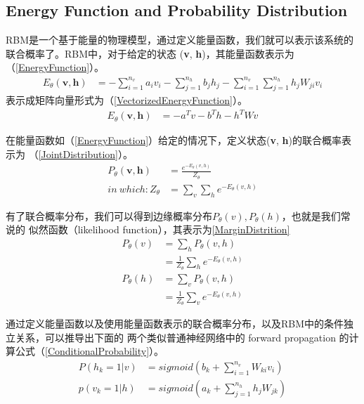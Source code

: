\documentclass[UTF8]{ctexart}
\begin{document}
\subsection{Energy Function and Probability Distribution}
RBM是一个基于能量的物理模型，通过定义能量函数，我们就可以表示该系统的联合概率了。RBM中，对于给定的状态
(\textbf{v}, \textbf{h})，其能量函数表示为（\ref{EnergyFunction}）。
\begin{align}
\label{EnergyFunction}
E_{\theta}(\textbf{v}, \textbf{h}) &= 
 -\sum_{i=1}^{n_v}a_i v_i - \sum_{j=1}^{n_h}b_j h_j 
 - \sum_{i=1}^{n_v} \sum_{j=1}^{n_h} h_j W_{ji} v_i
\end{align}
表示成矩阵向量形式为（\ref{VectorizedEnergyFunction}）。
\begin{align}
\label{VectorizedEnergyFunction}
E_{\theta}(\textbf{v}, \textbf{h}) &= 
 -a^T v - b^T h - h^T W v
\end{align}
\par
在能量函数如（\ref{EnergyFunction}）给定的情况下，定义状态(\textbf{v}, \textbf{h})的联合概率表示为
（\ref{JointDistribution}）。
\begin{align}
\label{JointDistribution}
P_{\theta}(\textbf{v}, \textbf{h}) &= 
  \frac{e^{-E_{\theta}(v, h)}}{Z_{\theta}}
\\
in \ which : Z_{\theta} &= \sum_{v}\sum_{h} e^{-E_{\theta}(v, h)}
\end{align}
\par
有了联合概率分布，我们可以得到边缘概率分布$P_{\theta}(v), P_{\theta}(h)$，也就是我们常说的
似然函数（likelihood function），其表示为\ref{MarginDistrition}
\begin{align}
\label{MarginDistrition}
P_{\theta}(v) &= \sum_{h}P_{\theta}(v, h) \\
&= \frac{1}{Z_{\theta}} \sum_{h}e^{-E_{\theta}(v, h)}
\\
P_{\theta}(h) &= \sum_{v}P_{\theta}(v, h) \\
&= \frac{1}{Z_{\theta}} \sum_{v}e^{-E_{\theta}(v, h)}
\end{align}

\par 通过定义能量函数以及使用能量函数表示的联合概率分布，以及RBM中的条件独立关系，可以推导出下面的
两个类似普通神经网络中的 forward propagation 的计算公式（\ref{ConditionalProbability}）。
\begin{align}
\label{ConditionalProbability}
P(h_k=1|v) &= sigmoid(b_k + \sum_{i=1}^{n_v} W_{ki}v_i)
\\
p(v_k=1|h) &= sigmoid(a_k + \sum_{j=1}^{n_h} h_j W_{jk})
\end{align}
\end{document}
